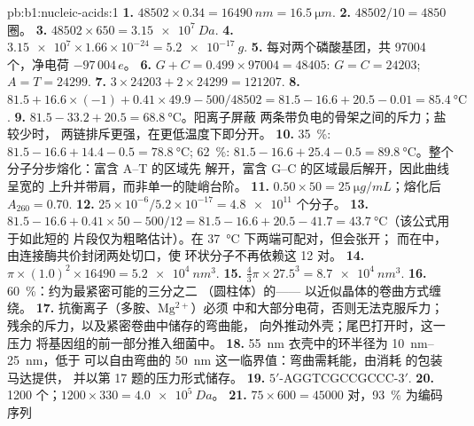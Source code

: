 \begin{solution}{pb:b1:nucleic-acids:1}
\textbf{1.} $\num{48502}\times 0.34 = \qty{16490}{nm} = \qty{16.5}{\micro m}$.
\textbf{2.} $\num{48502}/10 = 4850$ 圈。
\textbf{3.} $\num{48502}\times 650 = \qty{3.15e7}{Da}$.
\textbf{4.} $\num{3.15e7}\times 1.66\times 10^{-24} = \qty{5.2e-17}{g}$.
\textbf{5.} 每对两个磷酸基团，共 \num{97004} 个，净电荷 $-97\,004\,e$。
\textbf{6.} $G + C = 0.499\times\num{97004} = \num{48405}$: $G = C =
\num{24203}$; $A = T = \num{24299}$.
\textbf{7.} $3\times\num{24203} + 2\times\num{24299} = \num{121207}$.
\textbf{8.} $81.5 + 16.6\times(-1) + 0.41\times 49.9 - 500/48502 =
81.5 - 16.6 + 20.5 - 0.01 = \qty{85.4}{\celsius}$.
\textbf{9.} $81.5 - 33.2 + 20.5 = \qty{68.8}{\celsius}$。阳离子屏蔽
两条带负电的骨架之间的斥力；盐较少时，
两链排斥更强，在更低温度下即分开。
\textbf{10.} \qty{35}{\%}: $81.5 - 16.6 + 14.4 - 0.5 =
\qty{78.8}{\celsius}$; \qty{62}{\%}: $81.5 - 16.6 + 25.4 - 0.5 =
\qty{89.8}{\celsius}$。整个分子分步熔化：富含 A--T 的区域先
解开，富含 G--C 的区域最后解开，因此曲线呈宽的
上升并带肩，而非单一的陡峭台阶。
\textbf{11.} $0.50\times 50 = \qty{25}{\micro g/mL}$；熔化后
$A_{260} = 0.70$.
\textbf{12.} $25\times 10^{-6}/5.2\times 10^{-17} = \num{4.8e11}$ 个分子。
\textbf{13.} $81.5 - 16.6 + 0.41\times 50 - 500/12 = 81.5 - 16.6 + 20.5
- 41.7 = \qty{43.7}{\celsius}$（该公式用于如此短的
片段仅为粗略估计）。在 \qty{37}{\celsius} 下两端可配对，但会张开；
而在中，由连接酶共价封闭两处切口，使
环状分子不再依赖这 12 对。
\textbf{14.} $\pi\times(1.0)^2\times\num{16490} = \qty{5.2e4}{nm^3}$.
\textbf{15.} $\frac{4}{3}\pi\times 27.5^3 = \qty{8.7e4}{nm^3}$.
\textbf{16.} \qty{60}{\%}：约为最紧密可能的三分之二
（圆柱体）的—— 以近似晶体的卷曲方式缠绕。
\textbf{17.} 抗衡离子（多胺、$\mathrm{Mg^{2+}}$）必须
中和大部分电荷，否则无法克服斥力；
残余的斥力，以及紧密卷曲中储存的弯曲能，
向外推动外壳；尾巴打开时，这一压力
将基因组的前一部分推入细菌中。
\textbf{18.} \qty{55}{nm} 衣壳中的环半径为
\qtyrange{10}{25}{nm}，低于  可以自由弯曲的
\qty{50}{nm} 这一临界值：弯曲需耗能，由消耗  的包装马达提供，
并以第 17 题的压力形式储存。
\textbf{19.} $5'$-AGGTCGCCGCCC-$3'$.
\textbf{20.} \num{1200} 个；$1200\times 330 = \qty{4.0e5}{Da}$。
\textbf{21.} $75\times 600 = \num{45000}$ 对，\qty{93}{\%} 为编码序列

\end{solution}
